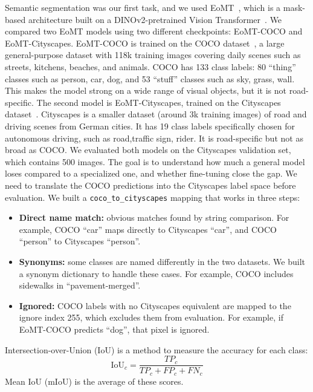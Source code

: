Semantic segmentation was our first task, and we used EoMT~\cite{eomt}, which is a mask-based architecture built on a DINOv2-pretrained Vision Transformer~\cite{dinov2}. 
We compared two EoMT models using two different checkpoints: EoMT-COCO and EoMT-Cityscapes. EoMT-COCO is trained on the COCO dataset~\cite{coco}, a large general-purpose dataset with 118k training images covering daily scenes such as streets, kitchens, beaches, and animals. 
COCO has 133 class labels: 80 ``thing'' classes such as person, car, dog, and 53 ``stuff'' classes such as sky, grass, wall. 
This makes the model strong on a wide range of visual objects, but it is not road-specific.
The second model is EoMT-Cityscapes, trained on the Cityscapes dataset~\cite{cityscapes}. Cityscapes is a smaller dataset (around 3k training images) of road and driving scenes from German cities. 
It has 19 class labels specifically chosen for autonomous driving, such as road,traffic sign, rider. It is road-specific but not as broad as COCO.
We evaluated both models on the Cityscapes validation set, which contains 500 images. 
The goal is to understand how much a general model loses compared to a specialized one, and whether fine-tuning close the gap. 
We need to translate the COCO predictions into the Cityscapes label space before evaluation.
We built a \texttt{coco\_to\_cityscapes} mapping that works in three steps:
\begin{itemize}
    \item \textbf{Direct name match:} obvious matches found by string comparison. For example, COCO ``car'' maps directly to Cityscapes ``car'', and COCO ``person'' to Cityscapes ``person''.
    \item \textbf{Synonyms:} some classes are named differently in the two datasets. We built a synonym dictionary to handle these cases. For example, COCO includes sidewalks in ``pavement-merged''.
    \item \textbf{Ignored:} COCO labels with no Cityscapes equivalent are mapped to the ignore index 255, which excludes them from evaluation. For example, if EoMT-COCO predicts ``dog'', that pixel is ignored.
\end{itemize}
Intersection-over-Union (IoU) is a method to measure the accuracy for each class:
\begin{equation}
\mathrm{IoU}_{c} = \frac{TP_{c}}{TP_{c} + FP_{c} + FN_{c}}
\label{eq:iou}
\end{equation}
Mean IoU (mIoU) is the average of these scores.

